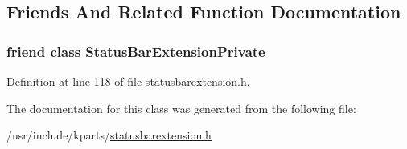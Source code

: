 \subsection{\-Friends \-And \-Related \-Function \-Documentation}
\hypertarget{classKParts_1_1StatusBarExtension_ad7fbe21a7ea073280f28211d53f7d775}{
\subsubsection[{\-Status\-Bar\-Extension\-Private}]{\setlength{\rightskip}{0pt plus 5cm}friend class {\bf \-Status\-Bar\-Extension\-Private}}}\label{classKParts_1_1StatusBarExtension_ad7fbe21a7ea073280f28211d53f7d775}


\-Definition at line 118 of file statusbarextension.\-h.



\-The documentation for this class was generated from the following file\-:\begin{DoxyCompactItemize}
\item 
/usr/include/kparts/\hyperlink{statusbarextension_8h}{statusbarextension.\-h}\end{DoxyCompactItemize}
